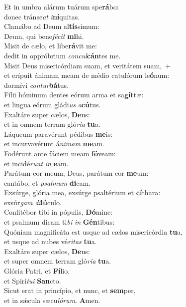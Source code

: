 \evenverse Et in umbra alárum tuárum spe\textbf{rá}bo:~\*\\
\evenverse donec tránse\textit{at} \textit{i}\textbf{ní}quitas.\\
\oddverse Clamábo ad Deum al\textbf{tís}simum:~\*\\
\oddverse Deum, qui bene\textit{fé}\textit{cit} \textbf{mi}hi.\\
\evenverse Misit de cælo, et libe\textbf{rá}vit me:~\*\\
\evenverse dedit in oppróbrium \textit{con}\textit{cul}\textbf{cán}tes me.\\
\oddverse Misit Deus misericórdiam suam, et veritátem suam,~+\\
\oddverse  et erípuit ánimam meam de médio catulórum le\textbf{ó}num:~\*\\
\oddverse dormívi \textit{con}\textit{tur}\textbf{bá}tus.\\
\evenverse Fílii hóminum dentes eórum arma et sa\textbf{gít}tæ:~\*\\
\evenverse et lingua eórum gládi\textit{us} \textit{a}\textbf{cú}tus.\\
\oddverse Exaltáre super cælos, \textbf{De}us:~\*\\
\oddverse et in omnem terram gló\textit{ri}\textit{a} \textbf{tu}a.\\
\evenverse Láqueum paravérunt pédibus \textbf{me}is:~\*\\
\evenverse et incurvavérunt á\textit{ni}\textit{mam} \textbf{me}am.\\
\oddverse Fodérunt ante fáciem meam \textbf{fó}veam:~\*\\
\oddverse et incidé\textit{runt} \textit{in} \textbf{e}am.\\
\evenverse Parátum cor meum, Deus, parátum cor \textbf{me}um:~\*\\
\evenverse cantábo, et \textit{psal}\textit{mum} \textbf{di}cam.\\
\oddverse Exsúrge, glória mea, exsúrge psaltérium et \textbf{cí}thara:~\*\\
\oddverse exsúr\textit{gam} \textit{di}\textbf{lú}culo.\\
\evenverse Confitébor tibi in pópulis, \textbf{Dó}mine:~\*\\
\evenverse et psalmum dicam ti\textit{bi} \textit{in} \textbf{Gén}tibus:\\
\oddverse Quóniam magnificáta est usque ad cælos misericórdia \textbf{tu}a,~\*\\
\oddverse et usque ad nubes vé\textit{ri}\textit{tas} \textbf{tu}a.\\
\evenverse Exaltáre super cælos, \textbf{De}us:~\*\\
\evenverse et super omnem terram gló\textit{ri}\textit{a} \textbf{tu}a.\\
\oddverse Glória Patri, et \textbf{Fí}lio,~\*\\
\oddverse et Spirí\textit{tu}\textit{i} \textbf{San}cto.\\
\evenverse Sicut erat in princípio, et nunc, et \textbf{sem}per,~\*\\
\evenverse et in sǽcula sæcu\textit{ló}\textit{rum}. \textbf{A}men.\\
